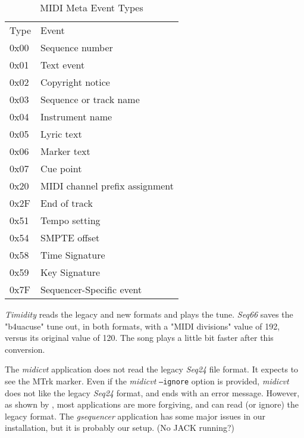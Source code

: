    \begin{table}
      \centering
      \caption{MIDI Meta Event Types}
      \label{table:midi_meta_event_types}
      \begin{tabular}{l l}
         Type & Event \\
         0x00 & Sequence number \\
         0x01 & Text event \\
         0x02 & Copyright notice \\
         0x03 & Sequence or track name \\
         0x04 & Instrument name \\
         0x05 & Lyric text \\
         0x06 & Marker text \\
         0x07 & Cue point \\
         0x20 & MIDI channel prefix assignment \\
         0x2F & End of track \\
         0x51 & Tempo setting \\
         0x54 & SMPTE offset \\
         0x58 & Time Signature \\
         0x59 & Key Signature \\
         0x7F & Sequencer-Specific event \\
      \end{tabular}
   \end{table}

   \textsl{Timidity} reads the legacy and new formats and plays the tune.
   \textsl{Seq66}  saves the "b4uacuse" tune out, in both formats,
   with a "MIDI divisions" value of 192, versus its original value of 120.
   The song plays a little bit faster after this conversion.

   The \textsl{midicvt} application does not read the legacy \textsl{Seq24}
   file format.  It
   expects to see the MTrk marker.  Even if the \textsl{midicvt}
   \texttt{--ignore} option is provided,
   \textsl{midicvt} does not like the legacy \textsl{Seq24} format, and ends
   with an error message.
   However, as shown by ,
   most applications are more
   forgiving, and can read (or ignore) the legacy format.  The
   \textsl{gsequencer} application has some major issues in our
   installation, but it is probably our setup.  (No JACK running?)

